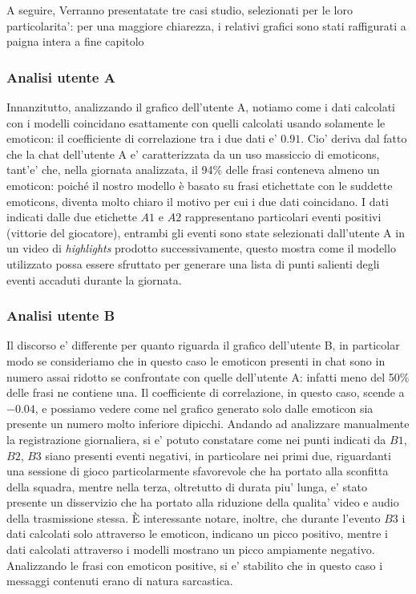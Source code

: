 \documentclass[a4paper,12pt,openright,twoside]{report}
\theoremstyle{definition}
\begin{document}
A seguire, Verranno presentatate tre casi studio, selezionati per le loro particolarita':
per una maggiore chiarezza, i relativi grafici sono stati raffigurati a paigna intera a fine
capitolo

\subsubsection{Analisi utente A}
Innanzitutto, analizzando il grafico dell'utente A, notiamo come i dati calcolati con i modelli coincidano esattamente
con quelli calcolati usando solamente le emoticon: il coefficiente di correlazione tra i due dati e' $0.91$. 
Cio' deriva dal fatto che la chat dell'utente A e' caratterizzata da
un uso massiccio di emoticons, tant'e' che, nella giornata analizzata, il 94\% delle frasi conteneva almeno un emoticon:
poiché il nostro modello è basato su frasi etichettate con le suddette emoticons, diventa molto chiaro il motivo per cui i due dati coincidano.
I dati indicati dalle due etichette $A1$ e $A2$ rappresentano particolari eventi positivi (vittorie del giocatore),
entrambi gli eventi sono state selezionati dall'utente A in un video di \emph{highlights} prodotto successivamente,
questo mostra come il modello utilizzato possa essere sfruttato per generare una lista di punti salienti degli
eventi accaduti durante la giornata.

\subsubsection{Analisi utente B}
Il discorso e' differente per quanto riguarda il grafico dell'utente B, in particolar
modo se consideriamo che in questo caso le emoticon presenti in chat
sono in numero assai ridotto se confrontate con quelle dell'utente A:
infatti meno del 50\%
delle frasi ne contiene una. Il coefficiente di correlazione, in questo caso, scende a $-0.04$, e possiamo vedere come
nel grafico generato solo dalle emoticon sia presente un numero molto inferiore dipicchi.
Andando ad analizzare manualmente la registrazione giornaliera, si e' potuto constatare come nei punti indicati da
$B1$, $B2$, $B3$ siano presenti eventi negativi, in particolare nei primi due, riguardanti una sessione di gioco
particolarmente sfavorevole che ha portato alla sconfitta della squadra, mentre nella terza, oltretutto di durata
piu' lunga, e' stato presente un disservizio che ha portato alla riduzione della qualita' video e audio della 
trasmissione stessa.
\`E interessante notare, inoltre, che durante l'evento $B3$ i dati calcolati solo attraverso le emoticon, indicano
un picco positivo, mentre i dati calcolati attraverso i modelli mostrano un picco ampiamente negativo. Analizzando
le frasi con emoticon positive, si e' stabilito che in questo caso i messaggi contenuti erano di natura sarcastica.
\end{document}
